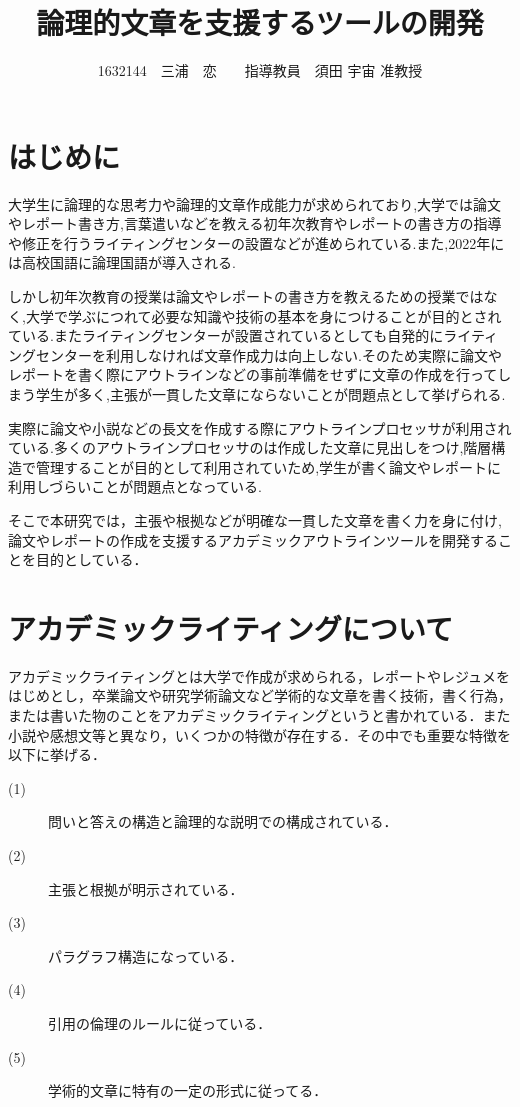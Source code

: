 \documentclass[twocolumn,10pt,a4j]{jsarticle}
\title{論理的文章を支援するツールの開発}
\author{1632144　三浦　恋　　指導教員　須田 宇宙 准教授}
\date{}
\begin{document}
\maketitle

\section{はじめに}

大学生に論理的な思考力や論理的文章作成能力が求められており,大学では論文やレポート書き方,言葉遣いなどを教える初年次教育やレポートの書き方の指導や修正を行うライティングセンターの設置などが進められている.また,2022年には高校国語に論理国語が導入される\cite{ren00}.
　
 
しかし初年次教育の授業は論文やレポートの書き方を教えるための授業ではなく,大学で学ぶにつれて必要な知識や技術の基本を身につけることが目的とされている.またライティングセンターが設置されているとしても自発的にライティングセンターを利用しなければ文章作成力は向上しない.そのため実際に論文やレポートを書く際にアウトラインなどの事前準備をせずに文章の作成を行ってしまう学生が多く,主張が一貫した文章にならないことが問題点として挙げられる.

実際に論文や小説などの長文を作成する際にアウトラインプロセッサが利用されている.多くのアウトラインプロセッサのは作成した文章に見出しをつけ,階層構造で管理することが目的として利用されていため,学生が書く論文やレポートに利用しづらいことが問題点となっている.

そこで本研究では，主張や根拠などが明確な一貫した文章を書く力を身に付け,論文やレポートの作成を支援するアカデミックアウトラインツールを開発することを目的としている．

\section{アカデミックライティングについて}
 アカデミックライティングとは大学で作成が求められる，レポートやレジュメをはじめとし，卒業論文や研究学術論文など学術的な文章を書く技術，書く行為，または書いた物のことをアカデミックライティングという\cite{ren01}と書かれている．また小説や感想文等と異なり，いくつかの特徴が存在する．その中でも重要な特徴を以下に挙げる．
\begin{description}
  \item[(1)] 問いと答えの構造と論理的な説明での構成されている．
  \item[(2)] 主張と根拠が明示されている．
  \item[(3)] パラグラフ構造になっている．
  \item[(4)] 引用の倫理のルールに従っている．
  \item[(5)] 学術的文章に特有の一定の形式に従ってる．
\end{description}
\end{document}

